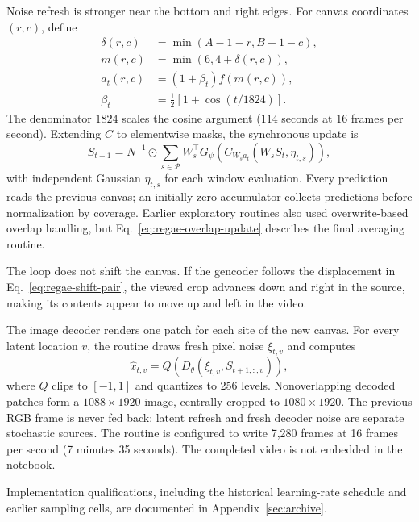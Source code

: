 Noise refresh is stronger near the bottom and right edges. For canvas coordinates $(r,c)$, define
\begin{align}
  \delta(r,c)&=\min(A-1-r,B-1-c),\\
  m(r,c)&=\min(6,4+\delta(r,c)),\\
  a_t(r,c)&=(1+\beta_t)f(m(r,c)),\\
  \beta_t&=\tfrac12\left[1+\cos(t/1824)\right].
  \label{eq:regae-refresh}
\end{align}
The denominator $1824$ scales the cosine argument ($114$ seconds at $16$ frames per second). Extending $C$ to elementwise masks, the synchronous update is
\begin{equation}
  S_{t+1}=N^{-1}\odot
  \sum_{s\in\mathcal{P}}W_s^\top
  G_\psi\!\left(C_{W_s a_t}(W_sS_t,\eta_{t,s})\right),
  \label{eq:regae-overlap-update}
\end{equation}
with independent Gaussian $\eta_{t,s}$ for each window evaluation. Every prediction reads the previous canvas; an initially zero accumulator collects predictions before normalization by coverage. Earlier exploratory routines also used overwrite-based overlap handling, but Eq.~\eqref{eq:regae-overlap-update} describes the final averaging routine.

The loop does not shift the canvas. If the gencoder follows the displacement in Eq.~\eqref{eq:regae-shift-pair}, the viewed crop advances down and right in the source, making its contents appear to move up and left in the video.

The image decoder renders one patch for each site of the new canvas. For every latent location $v$, the routine draws fresh pixel noise $\xi_{t,v}$ and computes
\begin{equation}
  \widehat x_{t,v}
  =Q\!\left(D_\theta(\xi_{t,v},S_{t+1,:,v})\right),
  \label{eq:regae-frame-decoding}
\end{equation}
where $Q$ clips to $[-1,1]$ and quantizes to 256 levels. Nonoverlapping decoded patches form a $1088\times1920$ image, centrally cropped to $1080\times1920$. The previous RGB frame is never fed back: latent refresh and fresh decoder noise are separate stochastic sources. The routine is configured to write 7,280 frames at 16 frames per second (7 minutes 35 seconds). The completed video is not embedded in the notebook.

Implementation qualifications, including the historical learning-rate schedule and earlier sampling cells, are documented in Appendix~\ref{sec:archive}.
